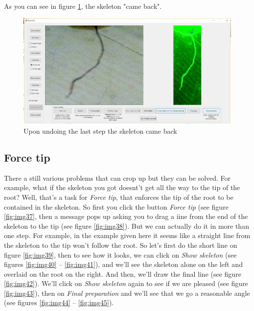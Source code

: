 As you can see in figure \ref{fig:img36}, the skeleton "came back".

\begin{figure}[H]
	\centering
	\includegraphics[width=\textwidth]{../Figures/manual/optionalA7.jpg}
	\caption{Upon undoing the last step the skeleton came back}
	\label{fig:img36}
\end{figure}


\subsection{Force tip}

There a still various problems that can crop up but they can be solved.
For example, what if the skeleton you got doesnt't get all the way to the tip of the root? 
Well, that's a task for \textit{Force tip}, that enforces the tip of the root to be contained in the skeleton. 
So first you click the button \textit{Force tip} (see figure \ref{fig:img37}, then a message pops up asking you to drag a iine from the end of the skeleton to the tip (see figure \ref{fig:img38}).
But we can actually do it in more than one step. For example, in the example given here it seems like a straight line from the skeleton to the tip won't follow the root. 
So let's first do the short line on figure \ref{fig:img39}, then to see how it looks, we can click on \textit{Show skeleton} (see figures \ref{fig:img40} -- \ref{fig:img41}),
and we'll see the skeleton alone on the left and overlaid on the root on the right. 
And then, we'll draw the final line (see figure \ref{fig:img42}).
We'll click on \textit{Show skeleton} again to see if we are pleased (see figure \ref{fig:img43}), then on \textit{Final preparation} and we'll see that we go a reasonable angle (see figures \ref{fig:img44} -- \ref{fig:img45}).


